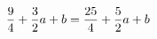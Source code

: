 \documentclass[preview]{standalone}
\begin{document}
\begin{align*}
\special{dvisvgm:raw <g id='unique000'>}\frac{9}{4}+\frac{3}{2}a+b = \frac{25}{4}+\frac{5}{2}a+b\special{dvisvgm:raw </g>}
\end{align*}
\end{document}
